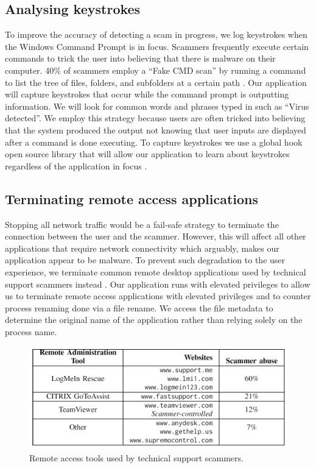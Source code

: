\documentclass[final]{IEEEtran}
\begin{document}
\subsection{Analysing keystrokes}
To improve the accuracy of detecting a scam in progress, we log keystrokes when the Windows Command Prompt is in focus. Scammers frequently execute certain commands to trick the user into believing that there is malware on their computer. 40\% of scammers employ a “Fake CMD scan” by running a command to list the tree of files, folders, and subfolders at a certain path \cite[p.7]{b2}. Our application will capture keystrokes that occur while the command prompt is outputting information. We will look for common words and phrases typed in such as “Virus detected”. We employ this strategy because users are often tricked into believing that the system produced the output not knowing that user inputs are displayed after a command is done executing. To capture keystrokes we use a global hook open source library that will allow our application to learn about keystrokes regardless of the application in focus \cite {b5}.

\subsection{Terminating remote access applications}
Stopping all network traffic would be a fail-safe strategy to terminate the connection between the user and the scammer. However, this will affect all other applications that require network connectivity which arguably, makes our application appear to be malware. To prevent such degradation to the user experience, we terminate common remote desktop applications used by technical support scammers instead \cite[Fig 4]{b2}. Our application runs with elevated privileges to allow us to terminate remote access applications with elevated privileges and to counter process renaming done via a file rename. We access the file metadata to determine the original name of the application rather than relying solely on the process name.

\begin{figure}[htbp]
\centerline{\includegraphics[keepaspectratio=true, scale = 0.22]{RemoteTools.png}}
\caption{Remote access tools used by technical support scammers.}
\label{fig 4}
\end{figure}
\end{document}
